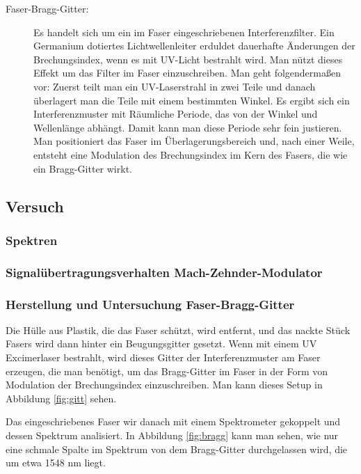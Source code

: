 \documentclass[a4paper]{article}
\begin{document}
\begin{description}
  \item[Faser-Bragg-Gitter:] 
    Es handelt sich um ein im Faser eingeschriebenen Interferenzfilter.
    Ein Germanium dotiertes Lichtwellenleiter erduldet dauerhafte Änderungen
    der Brechungsindex, wenn es mit UV-Licht bestrahlt wird.  Man nützt dieses
    Effekt um das Filter im Faser einzuschreiben. Man geht folgendermaßen vor:
    Zuerst teilt man ein UV-Laserstrahl in zwei Teile und danach überlagert man
    die Teile mit einem bestimmten Winkel. Es ergibt sich ein Interferenzmuster
    mit Räumliche Periode, das von der Winkel und Wellenlänge abhängt. Damit
    kann man diese Periode sehr fein justieren. Man positioniert das Faser im
    Überlagerungsbereich und, nach einer Weile, entsteht eine Modulation des
    Brechungsindex im Kern des Fasers, die wie ein Bragg-Gitter wirkt.
\end{description}

\subsection{Versuch}
\subsubsection{Spektren}
\subsubsection{Signalübertragungsverhalten Mach-Zehnder-Modulator}
\subsubsection{Herstellung und Untersuchung Faser-Bragg-Gitter}

Die Hülle aus Plastik, die das Faser schützt, wird entfernt, und das nackte
Stück Fasers wird dann hinter ein Beugungsgitter gesetzt. Wenn mit einem UV
Excimerlaser bestrahlt, wird dieses Gitter der Interferenzmuster am Faser
erzeugen, die man benötigt, um das Bragg-Gitter im Faser in der Form von
Modulation der Brechungsindex einzuschreiben. Man kann dieses Setup in
Abbildung \ref{fig:gitt} sehen. 

Das eingeschriebenes Faser wir danach mit einem Spektrometer gekoppelt und
dessen Spektrum analisiert. In Abbildung \ref{fig:bragg} kann man sehen, wie
nur eine schmale Spalte im Spektrum von dem Bragg-Gitter durchgelassen wird,
die um etwa 1548 nm liegt.
\end{document}
